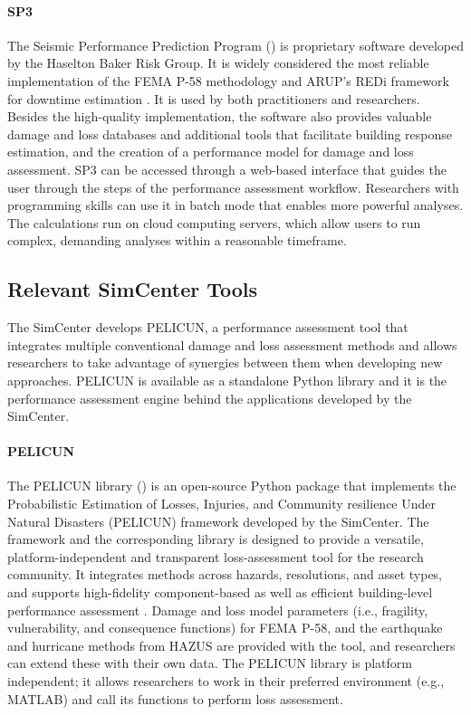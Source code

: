 \paragraph{SP3} The Seismic Performance Prediction Program () is proprietary software developed by the Haselton Baker Risk Group. It is widely considered the most reliable implementation of the FEMA P-58 methodology and ARUP's REDi framework for downtime estimation \citep{arup2013resiliencebased}. It is used by both practitioners and researchers. Besides the high-quality implementation, the software also provides valuable damage and loss databases and additional tools that facilitate building response estimation, and the creation of a performance model for damage and loss assessment. SP3 can be accessed through a web-based interface that guides the user through the steps of the performance assessment workflow. Researchers with programming skills can use it in batch mode that enables more powerful analyses. The calculations run on cloud computing servers, which allow users to run complex, demanding analyses within a reasonable timeframe.

\subsection{Relevant SimCenter Tools}

The SimCenter develops PELICUN, a performance assessment tool that integrates multiple conventional damage and loss assessment methods and allows researchers to take advantage of synergies between them when developing new approaches. PELICUN is available as a standalone Python library and it is the performance assessment engine behind the applications developed by the SimCenter.

\paragraph{PELICUN} The PELICUN library () is an open-source Python package that implements the Probabilistic Estimation of Losses, Injuries, and Community resilience Under Natural Disasters (PELICUN) framework developed by the SimCenter. The framework and the corresponding library is designed to provide a versatile, platform-independent and transparent loss-assessment tool for the research community. It integrates methods across hazards, resolutions, and asset types, and supports high-fidelity component-based as well as efficient building-level performance assessment \citep{zsarnoczay2020pelicun}. Damage and loss model parameters (i.e., fragility, vulnerability, and consequence functions) for FEMA P-58, and the earthquake and hurricane methods from HAZUS are provided with the tool, and researchers can extend these with their own data. The PELICUN library is platform independent; it allows researchers to work in their preferred environment (e.g., MATLAB) and call its functions to perform loss assessment. 

